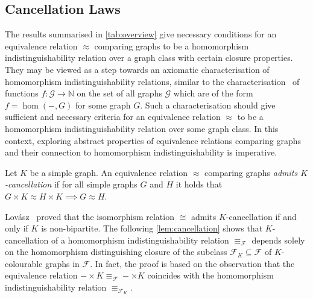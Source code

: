 \documentclass[3p,final]{elsarticle}
\begin{document}
	\subsection{Cancellation Laws}
	
	The results summarised in \cref{tab:overview} give necessary conditions for an equivalence relation $\approx$ comparing graphs to be a homomorphism indistinguishability relation over a graph class with certain closure properties.
	They may be viewed as a step towards an axiomatic characterisation of homomorphism indistinguishability relations, similar to the characterisation~\cite{freedman_reflection_2007,lovasz_semidefinite_2009} of functions $f \colon \mathcal{G} \to \mathbb{N}$ on the set of all graphs $\mathcal{G}$ which are of the form $f = \hom(-, G)$ for some graph $G$.
	Such a characterisation should give sufficient and necessary criteria for an equivalence relation $\approx$ to be a homomorphism indistinguishability relation over some graph class.
	In this context, exploring abstract properties of equivalence relations comparing graphs and their connection to homomorphism indistinguishability is imperative.
	
	\begin{definition}
	Let $K$ be a simple graph. An equivalence relation $\approx$ comparing graphs \emph{admits $K$-cancellation} if for all simple graphs $G$ and $H$ it holds that
	\(
	G \times K \approx H \times K \implies G \approx H.
	\)
	\end{definition}
	Lovász~\cite{lovasz_cancellation_1971} proved that the isomorphism relation $\cong$ admits $K$-cancellation if and only if $K$ is non-bipartite.
	The following \cref{lem:cancellation} shows that $K$-cancellation of a homomorphism indistinguishability relation $\equiv_{\mathcal{F}}$ depends solely on the homomorphism distinguishing closure of the subclass $\mathcal{F}_K \subseteq \mathcal{F}$ of $K$-colourable graphs in $\mathcal{F}$.
	In fact, the proof is based on the observation that the equivalence relation $- \times K \equiv_{\mathcal{F}} - \times K$ coincides with the homomorphism indistinguishability relation $\equiv_{\mathcal{F}_K}$.
	
\end{document}
